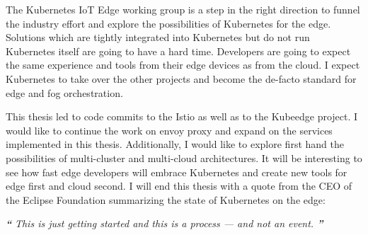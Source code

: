 The Kubernetes IoT Edge working group\cite{IntroducingDejanBosanac:KubernetesIoTEdgeWorkingGroup} is a step in the right direction to funnel the industry effort and explore the possibilities of Kubernetes for the edge. Solutions which are tightly integrated into Kubernetes but do not run Kubernetes itself are going to have a hard time. Developers are going to expect the same experience and tools from their edge devices as from the cloud. I expect Kubernetes to take over the other projects and become the de-facto standard for edge and fog orchestration. 

This thesis led to code commits to the Istio as well as to the Kubeedge project. I would like to continue the work on envoy proxy and expand on the services implemented in this thesis. Additionally, I would like to explore first hand the possibilities of multi-cluster and multi-cloud architectures. It will be interesting to see how fast edge developers will embrace Kubernetes and create new tools for edge first and cloud second.
I will end this thesis with a quote from the CEO of the Eclipse Foundation summarizing the state of Kubernetes on the edge:
\begin{displayquote}
\textit{\textbf{\Huge{``}}}
\textit{\large{
This is just getting started and this is a process — and not an event.\cite{ioFogMainBlog:online}
}}
\textit{\textbf{\Huge{''}}}
\\[1pt]
\end{displayquote}
